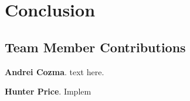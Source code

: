 
\section{Conclusion}
\label{sec:conclusion}





\appendix
\subsection{Team Member Contributions}

\textbf{Andrei Cozma}. text here.


\textbf{Hunter Price}. Implem


